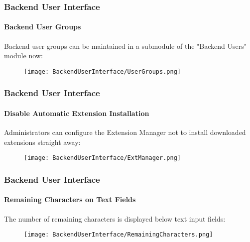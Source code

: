 \begin{frame}[fragile]
	\frametitle{Backend User Interface}
	\framesubtitle{Backend User Groups}

	Backend user groups can be maintained in a submodule of the "Backend Users" module now:

	\begin{figure}
		\texttt{[image: BackendUserInterface/UserGroups.png]}
	\end{figure}

\end{frame}

\begin{frame}[fragile]
	\frametitle{Backend User Interface}
	\framesubtitle{Disable Automatic Extension Installation}

	Administrators can configure the Extension Manager not to install downloaded
	extensions straight away:

	\begin{figure}
		\texttt{[image: BackendUserInterface/ExtManager.png]}
	\end{figure}

\end{frame}

\begin{frame}[fragile]
	\frametitle{Backend User Interface}
	\framesubtitle{Remaining Characters on Text Fields}

	The number of remaining characters is displayed below text input fields:

	\begin{figure}
		\texttt{[image: BackendUserInterface/RemainingCharacters.png]}
	\end{figure}

\end{frame}

